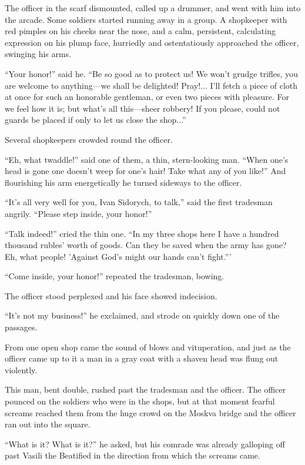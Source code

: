 The officer in the scarf dismounted, called up a drummer, and
went with him into the arcade. Some soldiers started running away
in a group. A shopkeeper with red pimples on his cheeks near the
nose, and a calm, persistent, calculating expression on his plump
face, hurriedly and ostentatiously approached the officer,
swinging his arms.

``Your honor!'' said he. ``Be so good as to protect us! We won't
grudge trifles, you are welcome to anything---we shall be
delighted! Pray!...  I'll fetch a piece of cloth at once for such
an honorable gentleman, or even two pieces with pleasure. For we
feel how it is; but what's all this---sheer robbery! If you
please, could not guards be placed if only to let us close the
shop...''

Several shopkeepers crowded round the officer.

``Eh, what twaddle!'' said one of them, a thin, stern-looking
man. ``When one's head is gone one doesn't weep for one's hair!
Take what any of you like!'' And flourishing his arm
energetically he turned sideways to the officer.

``It's all very well for you, Ivan Sidorych, to talk,'' said the
first tradesman angrily. ``Please step inside, your honor!''

``Talk indeed!'' cried the thin one. ``In my three shops here I
have a hundred thousand rubles' worth of goods. Can they be saved
when the army has gone? Eh, what people! 'Against God's might our
hands can't fight.'''

``Come inside, your honor!'' repeated the tradesman, bowing.

The officer stood perplexed and his face showed indecision.

``It's not my business!'' he exclaimed, and strode on quickly
down one of the passages.

From one open shop came the sound of blows and vituperation, and
just as the officer came up to it a man in a gray coat with a
shaven head was flung out violently.

This man, bent double, rushed past the tradesman and the
officer. The officer pounced on the soldiers who were in the
shops, but at that moment fearful screams reached them from the
huge crowd on the Moskva bridge and the officer ran out into the
square.

``What is it? What is it?'' he asked, but his comrade was already
galloping off past Vasili the Beatified in the direction from
which the screams came.

